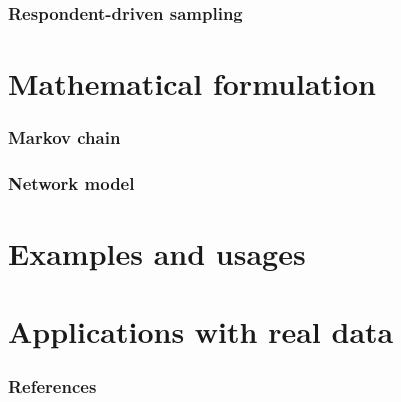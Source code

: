 \documentclass{beamer}
\begin{document}
\begin{frame}
  
  \frametitle{Respondent-driven sampling}

\end{frame}


\section{Mathematical formulation}

\begin{frame}
\frametitle{Markov chain}

\end{frame}

\begin{frame}
\frametitle{Network model}  

\end{frame}

\section{Examples and usages}

\section{Applications with real data}

\begin{frame}[t, allowframebreaks]
  \frametitle{References}
  
  
\end{frame}
\end{document}
